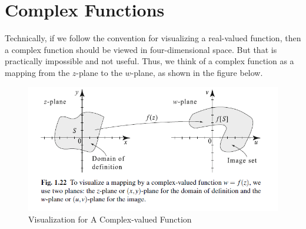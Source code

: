 \documentclass[11pt,reqno,oneside,a4paper]{article}
\begin{document}
\section{Complex Functions}

Technically, if we follow the convention for visualizing a real-valued function, then a complex function should be viewed in four-dimensional space. But that is practically impossible and not useful. Thus, we think of a complex function as a mapping from the $z$-plane to the $w$-plane, as shown in the figure below. 

\begin{figure}[htp]
	\centering
	\includegraphics[width=0.8\linewidth]{gfx/complex-function-vis.png}
	\caption{Visualization for A Complex-valued Function}
	\label{fig:complex-function-vis}
\end{figure}
\end{document}

